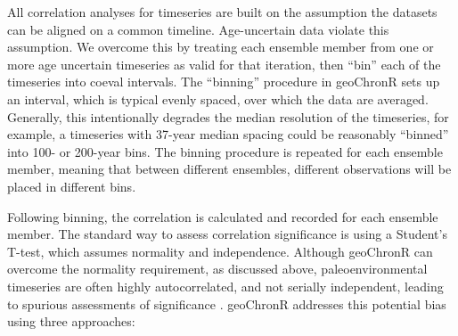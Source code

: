 \documentclass[gchron, manuscript]{copernicus}
\begin{document}
All correlation analyses for timeseries are built on the assumption the datasets can be aligned on a common timeline.
Age-uncertain data violate this assumption.
We overcome this by treating each ensemble member from one or more age uncertain timeseries as valid for that iteration, then ``bin'' each of the timeseries into coeval intervals.
The ``binning'' procedure in geoChronR sets up an interval, which is typical evenly spaced, over which the data are averaged. Generally, this intentionally degrades the median resolution of the timeseries, for example, a timeseries with 37-year median spacing could be reasonably ``binned'' into 100- or 200-year bins.
The binning procedure is repeated for each ensemble member, meaning that between different ensembles, different observations will be placed in different bins.

Following binning, the correlation is calculated and recorded for each ensemble member. The standard way to assess correlation significance is using a Student's T-test, which assumes normality and independence. Although geoChronR can overcome the normality requirement, as discussed above, paleoenvironmental timeseries are often highly autocorrelated, and not serially independent, leading to spurious assessments of significance \citep{Hu_epsl17}.
geoChronR addresses this potential bias using three approaches:
\end{document}
